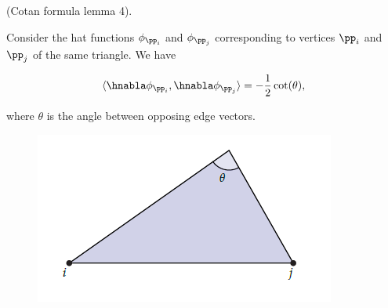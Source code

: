 \begin{lemma}
\label{ch::ddg::lemma::cotan_4}
    (Cotan formula lemma 4).
    
    Consider the hat functions $\phi_{\pp_i}$ and $\phi_{\pp_j}$ corresponding to vertices $\pp_i$ and $\pp_j$ of the same triangle. We have
    
    \begin{align*}
        \langle \hnabla \phi_{\pp_i}, \hnabla \phi_{\pp_j} \rangle = - \frac{1}{2} \cot(\theta),
    \end{align*}
    
    where $\theta$ is the angle between opposing edge vectors.
    
    \begin{figure}[H]
        \centering
        \includegraphics{images/fem_cotan_lemma4.PNG}
        \caption{\cite[p. 106]{book::DDG}}
    \end{figure}
\end{lemma}

